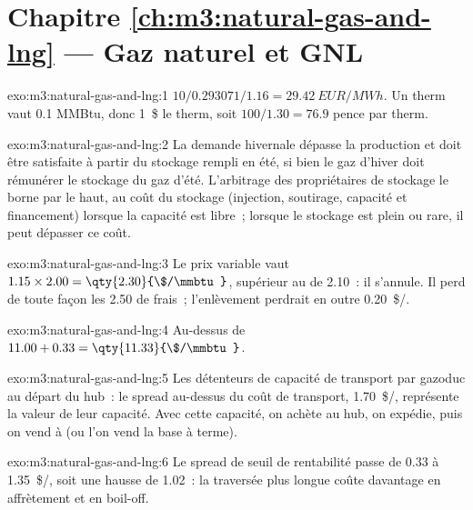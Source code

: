 \section*{Chapitre \ref{ch:m3:natural-gas-and-lng} --- Gaz naturel et GNL}

\begin{solution}{exo:m3:natural-gas-and-lng:1}
$10/0.293071/1.16 = \qty{29.42}{EUR/MWh}$. Un therm vaut 0.1 MMBtu, donc 1~\$ le therm, soit
$100/1.30 = 76.9$ pence par therm.
\end{solution}

\begin{solution}{exo:m3:natural-gas-and-lng:2}
La demande hivernale dépasse la production et doit être satisfaite à partir du stockage rempli en été, si bien
le gaz d'hiver doit rémunérer le stockage du gaz d'été. L'arbitrage des propriétaires de stockage le borne
par le haut, au coût du stockage (injection, soutirage, capacité et financement) lorsque
la capacité est libre~; lorsque le stockage est plein ou rare, il peut dépasser ce coût.
\end{solution}

\begin{solution}{exo:m3:natural-gas-and-lng:3}
Le prix variable vaut $1.15 \times 2.00 = \qty{2.30}{\$/\mmbtu}$, supérieur au  de
2.10~: il s'annule. Il perd de toute façon les \qty{2.50}{} de frais~; l'enlèvement
perdrait en outre \qty{0.20}{\$/\mmbtu}.
\end{solution}

\begin{solution}{exo:m3:natural-gas-and-lng:4}
Au-dessus de $11.00 + 0.33 = \qty{11.33}{\$/\mmbtu}$.
\end{solution}

\begin{solution}{exo:m3:natural-gas-and-lng:5}
Les détenteurs de capacité de transport par gazoduc au départ du hub~: le spread au-dessus du coût de transport,
\qty{1.70}{\$/\mmbtu}, représente la valeur de leur capacité. Avec cette capacité, on achète au hub, on expédie,
puis on vend à  (ou l'on vend la base à terme).
\end{solution}

\begin{solution}{exo:m3:natural-gas-and-lng:6}
Le spread de seuil de rentabilité passe de \qty{0.33}{} à \qty{1.35}{\$/\mmbtu}, soit une hausse de \qty{1.02}{}~: la
traversée plus longue coûte davantage en affrètement et en boil-off.
\end{solution}

